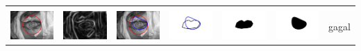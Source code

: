 \begin{table}[H]
\begin{tabular}{|m{0.7in}|m{0.7in}|m{0.7in}|m{0.7in}|m{0.7in}|m{0.7in}|m{0.7in}|}
		&  &  & & & &  \\
		\includegraphics[width=0.7in]{dataset/dataset_3/luka_kuning/ready/12_interp_init.jpg}&
		\includegraphics[width=0.7in]{dataset/dataset_3/luka_kuning/ready/12_interp_ext.jpg}&
		\includegraphics[width=0.7in]{dataset/dataset_3/luka_kuning/ready/12_interp_result.jpg}&
		\includegraphics[width=0.7in]{dataset/dataset_3/luka_kuning/ready/12_gt_r.jpg}&
		\includegraphics[width=0.7in]{dataset/dataset_3/luka_kuning/ready/12_r.jpg}&
		\includegraphics[width=0.7in]{dataset/dataset_3/luka_kuning/ready/12_interp_r.jpg}&
		gagal\\
		\hline
		

\end{tabular}
\end{table}
